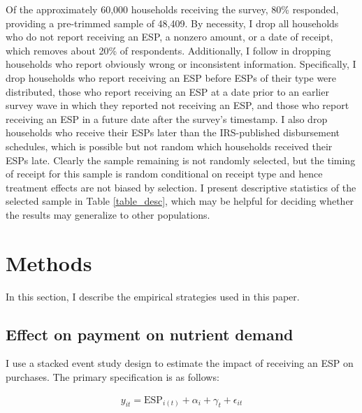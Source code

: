 \documentclass[12pt]{article}
\begin{document}
Of the approximately 60,000 households receiving the survey, 80\% responded, providing a pre-trimmed sample of 48,409. By necessity, I drop all households who do not report receiving an ESP, a nonzero amount, or a date of receipt, which removes about 20\% of respondents. Additionally, I follow \textcite{broda2014economic} in dropping households who report obviously wrong or inconsistent information. Specifically, I drop households who report receiving an ESP before ESPs of their type were distributed, those who report receiving an ESP at a date prior to an earlier survey wave in which they reported not receiving an ESP, and those who report receiving an ESP in a future date after the survey's timestamp. I also drop households who receive their ESPs later than the IRS-published disbursement schedules, which is possible but not random which households received their ESPs late. Clearly the sample remaining is not randomly selected, but the timing of receipt for this sample is random conditional on receipt type and hence treatment effects are not biased by selection. I present descriptive statistics of the selected sample in Table \ref{table_desc}, which may be helpful for deciding whether the results may generalize to other populations.


\section{Methods} \label{methods}

In this section, I describe the empirical strategies used in this paper.

\subsection{Effect on payment on nutrient demand}

I use a stacked event study design to estimate the impact of receiving an ESP on purchases. The primary specification is as follows:

\begin{align}
	y_{it} = \text{ESP}_{i(t)} + \alpha_i + \gamma_t + \epsilon_{it} \label{spec_es}
\end{align}
\end{document}
